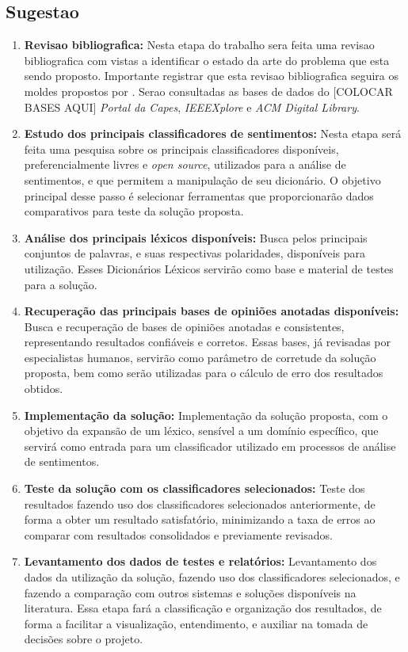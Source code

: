 \documentclass[a4paper,11pt]{article}
\begin{document}
\subsection{Sugestao}
\begin{enumerate}[D1.]
\item{\textbf{Revisao bibliografica:} Nesta etapa do trabalho sera feita uma revisao bibliografica com vistas a identificar o estado da arte do problema que esta sendo proposto. Importante registrar que esta revisao bibliografica seguira os moldes propostos por \cite{Kitchenham2004}}. Serao consultadas as bases de dados do [COLOCAR BASES AQUI] \emph{Portal da Capes}, \emph{IEEEXplore} e \emph{ACM Digital Library}.

\item{\textbf{Estudo dos principais classificadores de sentimentos:}}
Nesta etapa será feita uma pesquisa sobre os principais classificadores disponíveis, preferencialmente livres e \emph{open source}, utilizados para a análise de sentimentos, e que permitem a manipulação de seu dicionário. O objetivo principal desse passo é selecionar ferramentas que proporcionarão dados comparativos para teste da solução proposta.

\item{\textbf{Análise dos principais léxicos disponíveis:}}
Busca pelos principais conjuntos de palavras, e suas respectivas polaridades, disponíveis para utilização. Esses Dicionários Léxicos servirão como base e material de testes para a solução.

\item{\textbf{Recuperação das principais bases de opiniões anotadas disponíveis:}}
Busca e recuperação de bases de opiniões anotadas e consistentes, representando resultados confiáveis e corretos. Essas bases, já revisadas por especialistas humanos, servirão como parâmetro de corretude da solução proposta, bem como serão utilizadas para o cálculo de erro dos resultados obtidos.

\item{\textbf{Implementação da solução:}}
Implementação da solução proposta, com o objetivo da expansão de um léxico, sensível a um domínio específico, que servirá como entrada para um classificador utilizado em processos de análise de sentimentos.

\item{\textbf{Teste da solução com os classificadores selecionados:}}
Teste dos resultados fazendo uso dos classificadores selecionados anteriormente, de forma a obter um resultado satisfatório, minimizando a taxa de erros ao comparar com resultados consolidados e previamente revisados.

\item{\textbf{Levantamento dos dados de testes e relatórios:}}
Levantamento dos dados da utilização da solução, fazendo uso dos classificadores selecionados, e fazendo a comparação com outros sistemas e soluções disponíveis na literatura. Essa etapa fará a classificação e organização dos resultados, de forma a facilitar a visualização, entendimento, e auxiliar na tomada de decisões sobre o projeto.
\end{enumerate}
\end{document}
